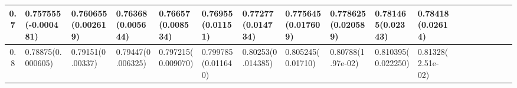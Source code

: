 \documentclass[
	article,			%
	12pt,				%
	twoside,			%
	a4paper,			%
	english,			%
	brazil,				%
	]{abntex2}
\begin{document}
\begin{landscape}
\begin{table}
\begin{tabular}{c||p{18mm}|p{18mm}|p{18mm}|p{18mm}|p{18mm}|p{18mm}|p{18mm}|p{18mm}|p{18mm}|p{18mm}|p{18mm}|p{18mm}|p{18mm}|p{18mm}|p{18mm}|p{18mm}|p{18mm}}
    			\hline 
    			0.7 & 0.757555\newline(-0.000481)&0.760655\newline(0.002619)&0.76368\newline(0.005644)&0.76657\newline(0.008534)&0.76955\newline(0.01151)&0.77277\newline(0.014734)&0.775645\newline(0.017609)&0.778625\newline(0.020589)&0.781465\newline(0.02343)&0.78418\newline(0.02614)\\
    			\hline		
    			
    			0.8 & 0.78875\newline(0.000605)&0.79151\newline(0.00337)&0.79447\newline(0.006325)&0.797215\newline(0.009070)&0.799785\newline(0.011640)&0.80253\newline(0.014385)&0.805245\newline(0.01710)&0.80788\newline(1.97e-02)&0.810395\newline(0.022250)&0.81328\newline(2.51e-02)\\
    			
    			\hline
    	

\end{tabular}
\end{table}
\end{landscape}
\end{document}
